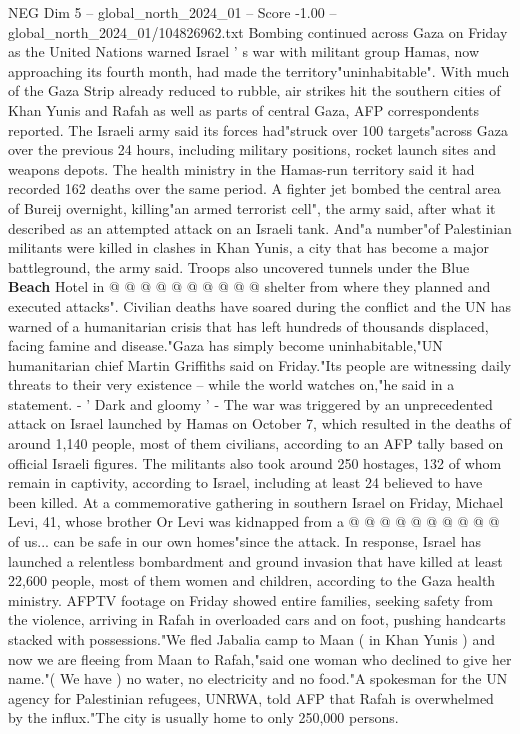 \begin{textsample}{NEG Dim 5 – global\_north\_2024\_01 – Score -1.00 – global\_north\_2024\_01/104826962.txt}  \label{ex:f5_neg_346}
Bombing continued across Gaza on Friday as the United Nations warned Israel ' s war with militant group Hamas, now approaching its fourth month, had made the territory"uninhabitable".
With much of the Gaza Strip already reduced to rubble, air strikes hit the southern cities of Khan Yunis and Rafah as well as parts of central Gaza, AFP correspondents reported.
The Israeli army said its forces had"struck over 100 targets"across Gaza over the previous 24 hours, including military positions, rocket launch sites and weapons depots.
The health ministry in the Hamas-run territory said it had recorded 162 deaths over the same period.
A fighter jet bombed the central area of Bureij overnight, killing"an armed terrorist cell", the army said, after what it described as an attempted attack on an Israeli tank.
And"a number"of Palestinian militants were killed in clashes in Khan Yunis, a city that has become a major battleground, the army said.
Troops also uncovered tunnels under the Blue \textbf{Beach} Hotel in @ @ @ @ @ @ @ @ @ @ shelter from where they planned and executed attacks".
Civilian deaths have soared during the conflict and the UN has warned of a humanitarian crisis that has left hundreds of thousands displaced, facing famine and disease."Gaza has simply become uninhabitable,"UN humanitarian chief Martin Griffiths said on Friday."Its people are witnessing daily threats to their very existence -- while the world watches on,"he said in a statement. - ' Dark and gloomy ' - The war was triggered by an unprecedented attack on Israel launched by Hamas on October 7, which resulted in the deaths of around 1,140 people, most of them civilians, according to an AFP tally based on official Israeli figures.
The militants also took around 250 hostages, 132 of whom remain in captivity, according to Israel, including at least 24 believed to have been killed.
At a commemorative gathering in southern Israel on Friday, Michael Levi, 41, whose brother Or Levi was kidnapped from a @ @ @ @ @ @ @ @ @ @ of us... can be safe in our own homes"since the attack.
In response, Israel has launched a relentless bombardment and ground invasion that have killed at least 22,600 people, most of them women and children, according to the Gaza health ministry.
AFPTV footage on Friday showed entire families, seeking safety from the violence, arriving in Rafah in overloaded cars and on foot, pushing handcarts stacked with possessions."We fled Jabalia camp to Maan ( in Khan Yunis ) and now we are fleeing from Maan to Rafah,"said one woman who declined to give her name."( We have ) no water, no electricity and no food."A spokesman for the UN agency for Palestinian refugees, UNRWA, told AFP that Rafah is overwhelmed by the influx."The city is usually home to only 250,000 persons.

\end{textsample}
